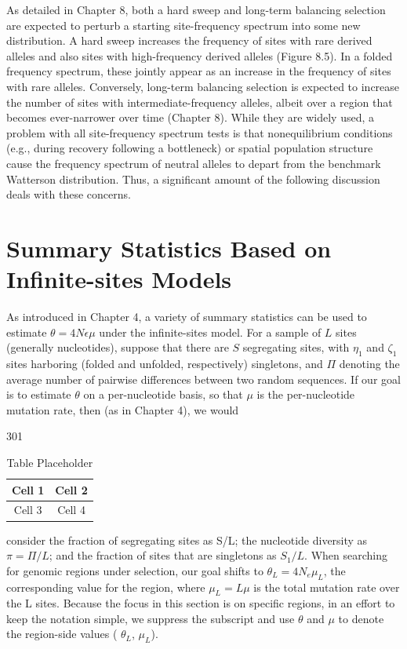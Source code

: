 \documentclass{article}
\begin{document}
As detailed in Chapter 8, both a hard sweep and long-term balancing selection are expected to perturb a starting site-frequency spectrum into some new distribution. A hard sweep increases the frequency of sites with rare derived alleles and also sites with high-frequency derived alleles (Figure 8.5). In a folded frequency spectrum, these jointly appear as an increase in the frequency of sites with rare alleles. Conversely, long-term balancing selection is expected to increase the number of sites with intermediate-frequency alleles, albeit over a region that becomes ever-narrower over time (Chapter 8). While they are widely used, a problem with all site-frequency spectrum tests is that nonequilibrium conditions (e.g., during recovery following a bottleneck) or spatial population structure cause the frequency spectrum of neutral alleles to depart from the benchmark Watterson distribution. Thus, a significant amount of the following discussion deals with these concerns.

\section{Summary Statistics Based on Infinite-sites Models}
As introduced in Chapter 4, a variety of summary statistics can be used to estimate  $ \theta = 4N\epsilon\mu $ under the infinite-sites model. For a sample of  $ L $ sites (generally nucleotides), suppose that there are  $ S $ segregating sites, with  $ \eta_1 $ and  $ \zeta_1 $ sites harboring (folded and unfolded, respectively) singletons, and  $ \Pi $ denoting the average number of pairwise differences between two random sequences. If our goal is to estimate  $ \theta $ on a per-nucleotide basis, so that  $ \mu $ is the per-nucleotide mutation rate, then (as in Chapter 4), we would

301

\begin{table}[h]
\centering
\begin{tabular}{|c|c|}
\hline
Cell 1 & Cell 2 \\
\hline
Cell 3 & Cell 4 \\
\hline
\end{tabular}
\caption{Table Placeholder}
\end{table}

consider the fraction of segregating sites as S/L; the nucleotide diversity as  $ \pi = \Pi/L $; and the fraction of sites that are singletons as  $ S_1/L $. When searching for genomic regions under selection, our goal shifts to  $ \theta_L = 4N_e\mu_L $, the corresponding value for the region, where  $ \mu_L = L\mu $ is the total mutation rate over the L sites. Because the focus in this section is on specific regions, in an effort to keep the notation simple, we suppress the subscript and use  $ \theta $ and  $ \mu $ to denote the region-side values ( $ \theta_L $,  $ \mu_L $).
\end{document}
